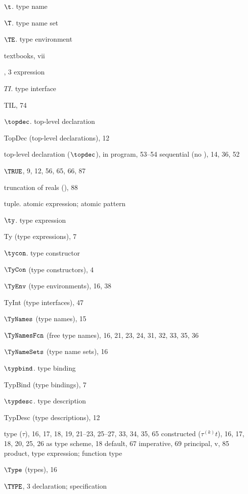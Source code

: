 \begin{theindex}
\item $\t$. \see type name
\item $\T$. \see type name set
\item $\TE$. \see type environment
\item textbooks, vii
\item \THEN, 3
\subitem \seealso expression
\item $T\!I$. \see type interface
\item TIL, 74
\item $\topdec$. \see top-level declaration
\item TopDec (top-level declarations), 12
\item top-level declaration ($\topdec$),
\subitem in program, 53--54
\subitem sequential (no \boxml{;}), 14, 36, 52
\item $\TRUE$, 9, 12, 56, 65,  66, 87
\item truncation of reals (), 88
\item tuple. \see atomic expression; atomic pattern
\item $\ty$. \see type expression
\item Ty (type expressions), 7
\item $\tycon$. \see type constructor
\item $\TyCon$ (type constructors), 4
\item $\TyEnv$ (type environments), 16, 38
\item TyInt (type interfaces), 47
\item $\TyNames$ (type names), 15
\item $\TyNamesFcn$ (free type names), 16, 21, 23, 24, 31, 32, 33, 35, 36
\item $\TyNameSets$ (type name sets), 16
\item $\typbind$. \see type binding
\item TypBind (type bindings), 7
\item $\typdesc$. \see type description
\item TypDesc (type descriptions), 12
\item type ($\tau$), 16, 17, 18, 19, 21--23, 25--27, 33, 34, 35, 65
\subitem constructed ($\tau^{(k)}t$), 16, 17, 18, 20, 25, 26
\subitem as type scheme, 18
\subitem default, 67
\subitem imperative, 69
\subitem principal, v, 85
\subitem product, \startyperefs
\subitem \seealso type expression; function type
\item $\Type$ (types), 16
\item $\TYPE$, 3
\subitem \seealso declaration; specification

\end{theindex}
